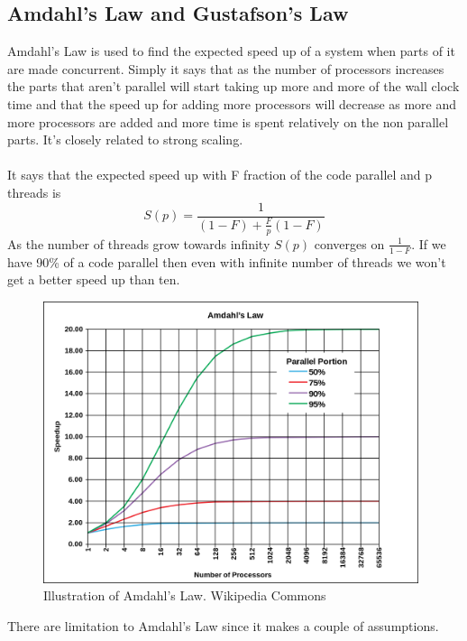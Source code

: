 \documentclass[10pt,a4paper]{report}
\begin{document}
\subsection{Amdahl's Law and Gustafson's Law}
Amdahl's Law is used to find the expected speed up of a system when parts of it are made concurrent. Simply it says that as the number of processors increases the parts that aren't parallel will start taking up more and more of the wall clock time and that the speed up for adding more processors will decrease as more and more processors are added and more time is spent relatively on the non parallel parts\cite{introduction_hpc_hager}. It's closely related to strong scaling.\cite{cuda_best_practice,2010_reevaluating_amdahl}\\
\\
It says that the expected speed up with F fraction of the code parallel and p threads is\cite{introduction_hpc_hager} 
$$S(p)=\frac{1}{(1-F)+\frac{F}{p}(1-F)}$$
As the number of threads grow towards infinity $S(p)$ converges on $\frac{1}{1-F}$. If we have 90\% of a code parallel then even with infinite number of threads we won't get a better speed up than ten.\cite{2010_reevaluating_amdahl}

\begin{figure}[h]
    \centering
    \includegraphics[width=11cm]{AmdahlsLaw.png}
    \caption{Illustration of Amdahl's Law. Wikipedia Commons}
    \label{fig:AmdahlsLaw}
\end{figure}

There are limitation to Amdahl's Law since it makes a couple of assumptions.
\end{document}

